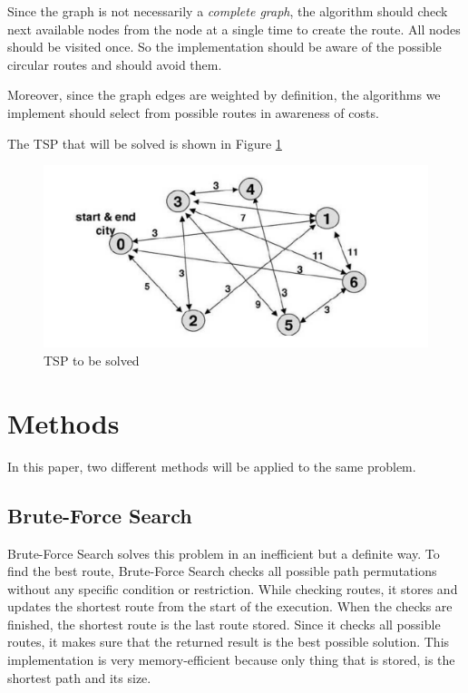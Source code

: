 \documentclass[journal,transmag]{IEEEtran}
\begin{document}
    Since the graph is not necessarily a \textit{complete graph}, the algorithm
    should check next available nodes from the node at a single time to create
    the route. All nodes should be visited once. So the implementation should be
    aware of the possible circular routes and should avoid them.

    Moreover, since the graph edges are weighted by definition, the algorithms we
    implement should select from possible routes in awareness of costs.

    The TSP that will be solved is shown in Figure \ref{fig:tsp-problem}

    \begin{figure}[h!]
        \includegraphics[width=\linewidth]{tsp.png}
        \caption{TSP to be solved}
        \label{fig:tsp-problem}
    \end{figure}


    \section{Methods}

    In this paper, two different methods will be applied to the same problem.

    \subsection{Brute-Force Search}

    Brute-Force Search solves this problem in an inefficient but a definite way.
    To find the best route, Brute-Force Search checks all possible path
    permutations without any specific condition or restriction. While checking
    routes, it stores and updates the shortest route from the start of the
    execution. When the checks are finished, the shortest route is the last
    route stored. Since it checks all possible routes, it makes sure that the
    returned result is the best possible solution. This implementation is very
    memory-efficient because only thing that is stored, is the shortest path and
    its size.
\end{document}
